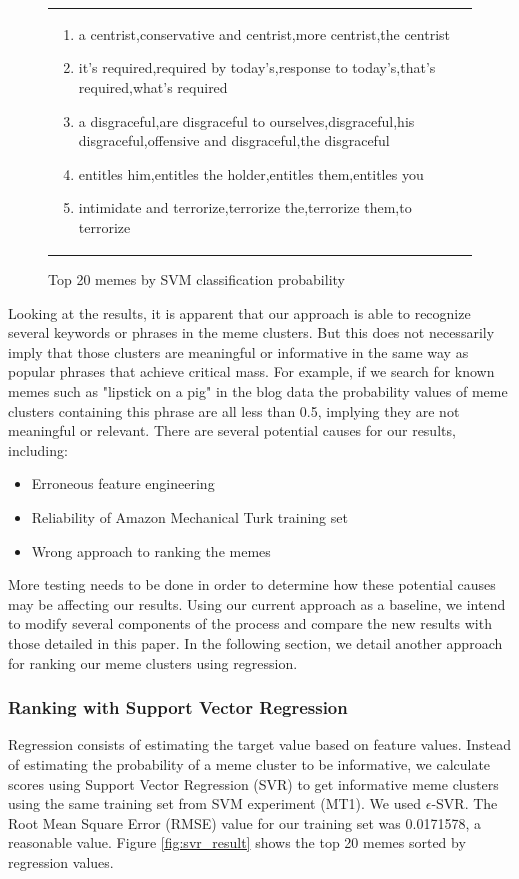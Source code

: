 \documentclass{sig-alternate}
\begin{document}
\begin{figure}[htb]
\begin{center}
{\begin{tabular}{p{16cm}}
\begin{enumerate}
\item a centrist,conservative and centrist,more centrist,the centrist
\item it's required,required by today's,response to today's,that's required,what's required
\item a disgraceful,are disgraceful to ourselves,disgraceful,his disgraceful,offensive and disgraceful,the disgraceful
\item entitles him,entitles the holder,entitles them,entitles you
\item intimidate and terrorize,terrorize the,terrorize them,to terrorize
\end{enumerate}

\end{tabular}
}
\caption{Top 20 memes by SVM classification probability}
\label{fig:svm_result}
\end{center}
\end{figure}

Looking at the results, it is apparent that our approach is able to recognize several keywords or phrases in the meme clusters. But this does not necessarily imply that those clusters are meaningful or informative in the same way as popular phrases that achieve critical mass. For example, if we search for known memes such as "lipstick on a pig" in the blog data the probability values of meme clusters containing this phrase are all less than 0.5, implying they are not meaningful or relevant. There are several potential causes for our results, including:
\begin{itemize}
 \item Erroneous feature engineering
 \item Reliability of Amazon Mechanical Turk training set
 \item Wrong approach to ranking the memes
\end{itemize}

More testing needs to be done in order to determine how these potential causes may be affecting our results. Using our current approach as a baseline, we intend to modify several components of the process and compare the new results with those detailed in this paper. In the following section, we detail another approach for ranking our meme clusters using regression.

\subsubsection{Ranking with Support Vector Regression}
Regression consists of estimating the target value based on feature values. Instead of estimating the probability of a meme cluster to be informative, we calculate scores using Support Vector Regression (SVR) to get informative meme clusters using the same training set from SVM experiment (MT1). We used $\epsilon$-SVR. The Root Mean Square Error (RMSE) value for our training set was 0.0171578, a reasonable value. Figure \ref{fig:svr_result} shows the top 20 memes sorted by regression values.
\end{document}
